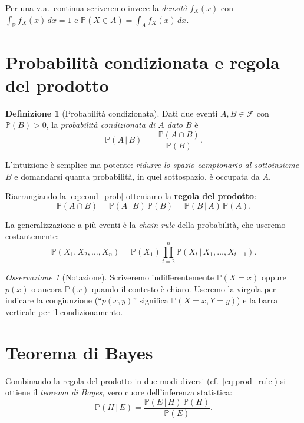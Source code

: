 \documentclass[11pt,a4paper,oneside]{book}
\theoremstyle{plain}
\theoremstyle{definition}
\newtheorem{definizione}[teorema]{Definizione}
\theoremstyle{remark}
\newtheorem{osservazione}[teorema]{Osservazione}
\newcommand{\R}{\mathbb{R}}
\newcommand{\Prob}{\mathbb{P}}
\newcommand{\given}{\,\vert\,}
\begin{document}
Per una v.a.\ continua scriveremo invece la \emph{densità} $f_X(x)$
con $\int_{\R} f_X(x)\,dx = 1$ e $\Prob(X\in A) = \int_A f_X(x)\,dx$.

\section{Probabilità condizionata e regola del prodotto}

\begin{definizione}[Probabilità condizionata]
Dati due eventi $A,B\in\mathcal{F}$ con $\Prob(B)>0$, la \emph{probabilità
condizionata di $A$ dato $B$} è
\begin{equation}
    \Prob(A\given B) \;=\; \frac{\Prob(A\cap B)}{\Prob(B)}.
    \label{eq:cond_prob}
\end{equation}
\end{definizione}

L'intuizione è semplice ma potente: \emph{ridurre lo spazio campionario
al sottoinsieme $B$} e domandarsi quanta probabilità, in quel
sottospazio, è occupata da $A$.

Riarrangiando la \eqref{eq:cond_prob} otteniamo la \textbf{regola del
prodotto}:
\begin{equation}
    \Prob(A\cap B) = \Prob(A\given B)\,\Prob(B) = \Prob(B\given A)\,\Prob(A).
    \label{eq:prod_rule}
\end{equation}

La generalizzazione a più eventi è la \emph{chain rule} della
probabilità, che useremo costantemente:
\begin{equation}
    \Prob(X_1,X_2,\dots,X_n)
    = \Prob(X_1)\prod_{t=2}^{n} \Prob(X_t \given X_1,\dots,X_{t-1}).
    \label{eq:chain_rule}
\end{equation}

\begin{osservazione}[Notazione]
Scriveremo indifferentemente $\Prob(X=x)$ oppure $p(x)$ o ancora
$\Prob(x)$ quando il contesto è chiaro. Useremo la virgola per
indicare la congiunzione (``$p(x,y)$'' significa $\Prob(X=x,Y=y)$)
e la barra verticale per il condizionamento.
\end{osservazione}

\section{Teorema di Bayes}

Combinando la regola del prodotto in due modi diversi (cf.\
\eqref{eq:prod_rule}) si ottiene il \emph{teorema di Bayes}, vero
cuore dell'inferenza statistica:
\begin{equation}
    \Prob(H\given E) = \frac{\Prob(E\given H)\,\Prob(H)}{\Prob(E)}.
    \label{eq:bayes}
\end{equation}
\end{document}
